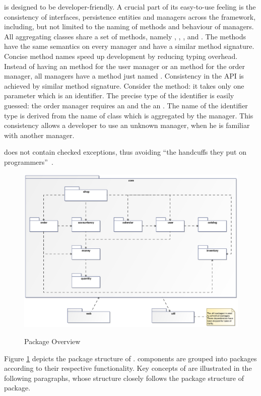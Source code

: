 \salespoint{} is designed to be developer-friendly.
A crucial part of its easy-to-use feeling is the consistency of interfaces, persistence entities and managers across the framework, including, but not limited to the naming of methods and behaviour of managers.
All aggregating classes share a set of methods, namely , , ,  and .
The methods have the same semantics on every manager and have a similar method signature.
Concise method names speed up development by reducing typing overhead.
Instead of having an  method for the user manager or an  method for the order manager, all managers have a method just named .
Consistency in the API is achieved by similar method signature.
Consider the  method: it takes only one parameter which is an identifier.
The precise type of the identifier is easily guessed: the order manager requires an  and the  an .
The name of the identifier type is derived from the name of class which is aggregated by the manager.
This consistency allows a developer to use an unknown manager, when he is familiar with another manager.

\salespoint{} does not contain checked exceptions, thus avoiding ``the handcuffs they put on programmers''~\cite{checked-exceptions}.
\\

\begin{figure}
	\centering
  \includegraphics[width=1.0\textwidth]{images/Package_Overview.eps}
	\label{package_overview}
	\caption{Package Overview}
\end{figure}

Figure \ref{package_overview} depicts the package structure of \salespoint{}.
\salespoint{} components are grouped into packages according to their respective functionality.
Key concepts of \salespoint{} are illustrated in the following paragraphs, whose structure closely follows the package structure of \salespoint{}  package.











